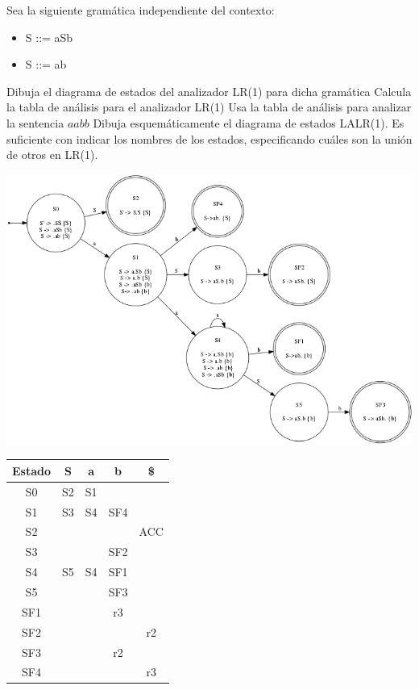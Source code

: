 \documentclass[nochap]{apuntes}
\begin{document}
\begin{problem}
Sea la siguiente gramática independiente del contexto:
\begin{itemize}
\item S ::= aSb
\item S ::= ab
\end{itemize}
\ppart Dibuja el diagrama de estados del analizador LR(1) para dicha gramática
\ppart Calcula la tabla de análisis para el analizador LR(1)
\ppart Usa la tabla de análisis para analizar la sentencia $aabb$
\ppart Dibuja esquemáticamente el diagrama de estados LALR(1). Es suficiente con indicar los nombres de los estados, especificando cuáles son la unión de otros en LR(1).
\solution
\ppart
\begin{center}
\includegraphics[scale=0.65]{automata_H3E8.png}
\end{center}

\ppart
\begin{tabular}{| c | c | c | c | c |}
\hline
Estado & S & a & b & \$\\
\hline
S0 & S2 & S1 & & \\
\hline
S1 & S3 & S4 & SF4 & \\
\hline
S2 & & & & ACC \\
\hline
S3 & & & SF2 & \\
\hline
S4 & S5 & S4 & SF1 & \\
\hline
S5 & & & SF3 & \\
\hline
SF1 & & & r3 & \\
\hline
SF2 & & & & r2\\
\hline
SF3 & & & r2 & \\
\hline
SF4 & & & & r3 \\
\hline
\end{tabular}


\end{problem}
\end{document}
